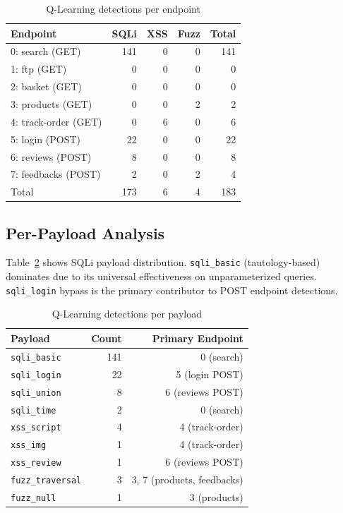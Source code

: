 \documentclass[5p,twocolumn]{elsarticle}
\begin{document}
\begin{table}[t]
\caption{Q-Learning detections per endpoint}
\centering
\small
\label{tab:per_endpoint}
\begin{tabular}{lrrrr}
\toprule
Endpoint & SQLi & XSS & Fuzz & Total \\
\midrule
0: search (GET) & 141 & 0 & 0 & 141 \\
1: ftp (GET) & 0 & 0 & 0 & 0 \\
2: basket (GET) & 0 & 0 & 0 & 0 \\
3: products (GET) & 0 & 0 & 2 & 2 \\
4: track-order (GET) & 0 & 6 & 0 & 6 \\
5: login (POST) & 22 & 0 & 0 & 22 \\
6: reviews (POST) & 8 & 0 & 0 & 8 \\
7: feedbacks (POST) & 2 & 0 & 2 & 4 \\
\midrule
Total & 173 & 6 & 4 & 183 \\
\bottomrule
\end{tabular}
\end{table}

\subsection{Per-Payload Analysis}

Table~\ref{tab:per_payload} shows SQLi payload distribution. \texttt{sqli\_basic} (tautology-based) dominates due to its universal effectiveness on unparameterized queries. \texttt{sqli\_login} bypass is the primary contributor to POST endpoint detections.

\begin{table}[t]
\caption{Q-Learning detections per payload}
\centering
\small
\label{tab:per_payload}
\begin{tabular}{lrr}
\toprule
Payload & Count & Primary Endpoint \\
\midrule
\texttt{sqli\_basic} & 141 & 0 (search) \\
\texttt{sqli\_login} & 22 & 5 (login POST) \\
\texttt{sqli\_union} & 8 & 6 (reviews POST) \\
\texttt{sqli\_time} & 2 & 0 (search) \\
\texttt{xss\_script} & 4 & 4 (track-order) \\
\texttt{xss\_img} & 1 & 4 (track-order) \\
\texttt{xss\_review} & 1 & 6 (reviews POST) \\
\texttt{fuzz\_traversal} & 3 & 3, 7 (products, feedbacks) \\
\texttt{fuzz\_null} & 1 & 3 (products) \\
\bottomrule
\end{tabular}
\end{table}
\end{document}
